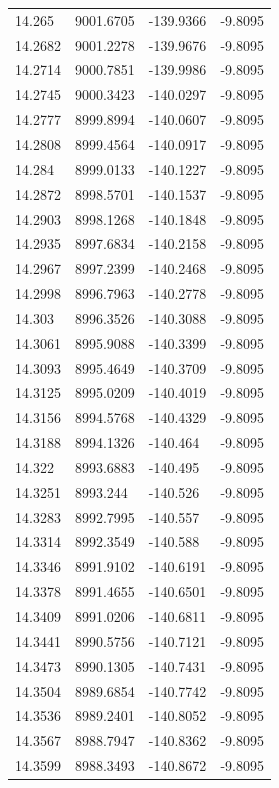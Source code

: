 \begin{table}[H]
\begin{tabular}{llll}
14.265 & 9001.6705 & -139.9366 & -9.8095 \\
14.2682 & 9001.2278 & -139.9676 & -9.8095 \\
14.2714 & 9000.7851 & -139.9986 & -9.8095 \\
14.2745 & 9000.3423 & -140.0297 & -9.8095 \\
14.2777 & 8999.8994 & -140.0607 & -9.8095 \\
14.2808 & 8999.4564 & -140.0917 & -9.8095 \\
14.284 & 8999.0133 & -140.1227 & -9.8095 \\
14.2872 & 8998.5701 & -140.1537 & -9.8095 \\
14.2903 & 8998.1268 & -140.1848 & -9.8095 \\
14.2935 & 8997.6834 & -140.2158 & -9.8095 \\
14.2967 & 8997.2399 & -140.2468 & -9.8095 \\
14.2998 & 8996.7963 & -140.2778 & -9.8095 \\
14.303 & 8996.3526 & -140.3088 & -9.8095 \\
14.3061 & 8995.9088 & -140.3399 & -9.8095 \\
14.3093 & 8995.4649 & -140.3709 & -9.8095 \\
14.3125 & 8995.0209 & -140.4019 & -9.8095 \\
14.3156 & 8994.5768 & -140.4329 & -9.8095 \\
14.3188 & 8994.1326 & -140.464 & -9.8095 \\
14.322 & 8993.6883 & -140.495 & -9.8095 \\
14.3251 & 8993.244 & -140.526 & -9.8095 \\
14.3283 & 8992.7995 & -140.557 & -9.8095 \\
14.3314 & 8992.3549 & -140.588 & -9.8095 \\
14.3346 & 8991.9102 & -140.6191 & -9.8095 \\
14.3378 & 8991.4655 & -140.6501 & -9.8095 \\
14.3409 & 8991.0206 & -140.6811 & -9.8095 \\
14.3441 & 8990.5756 & -140.7121 & -9.8095 \\
14.3473 & 8990.1305 & -140.7431 & -9.8095 \\
14.3504 & 8989.6854 & -140.7742 & -9.8095 \\
14.3536 & 8989.2401 & -140.8052 & -9.8095 \\
14.3567 & 8988.7947 & -140.8362 & -9.8095 \\
14.3599 & 8988.3493 & -140.8672 & -9.8095 \\

\end{tabular}
\end{table}
